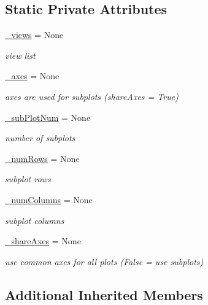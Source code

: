 \subsection*{Static Private Attributes}
\begin{DoxyCompactItemize}
\item 
\hyperlink{class_mu_mo_t_1_1_mu_mo_tmulti_view_af533f289cf818694f54ab8bd57083537}{\+\_\+views} = None
\begin{DoxyCompactList}\small\item\em view list \end{DoxyCompactList}\item 
\hyperlink{class_mu_mo_t_1_1_mu_mo_tmulti_view_a302b03ed97754a48ed830efba51e8d37}{\+\_\+axes} = None
\begin{DoxyCompactList}\small\item\em axes are used for subplots (\textquotesingle{}share\+Axes = True\textquotesingle{}) \end{DoxyCompactList}\item 
\hyperlink{class_mu_mo_t_1_1_mu_mo_tmulti_view_a9b9e6dc4ee0823b917bb0ee0d636f84d}{\+\_\+sub\+Plot\+Num} = None
\begin{DoxyCompactList}\small\item\em number of subplots \end{DoxyCompactList}\item 
\hyperlink{class_mu_mo_t_1_1_mu_mo_tmulti_view_a7943427bc009bd206f958f785e744381}{\+\_\+num\+Rows} = None
\begin{DoxyCompactList}\small\item\em subplot rows \end{DoxyCompactList}\item 
\hyperlink{class_mu_mo_t_1_1_mu_mo_tmulti_view_ac14e35edb2af762045879408234589d5}{\+\_\+num\+Columns} = None
\begin{DoxyCompactList}\small\item\em subplot columns \end{DoxyCompactList}\item 
\hyperlink{class_mu_mo_t_1_1_mu_mo_tmulti_view_a564f1d8714ede71e8f36f29d64193518}{\+\_\+share\+Axes} = None
\begin{DoxyCompactList}\small\item\em use common axes for all plots (False = use subplots) \end{DoxyCompactList}\end{DoxyCompactItemize}
\subsection*{Additional Inherited Members}



